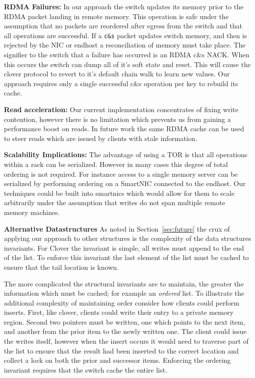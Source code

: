 


\textbf{RDMA Failures:}
In our approach the switch updates its memory prior to the RDMA packet
landing in remote memory. This operation is safe under the assumption that no
packets are reordered after egress from the switch and that all operations
are successful. If a \texttt{c\&s} packet updates switch memory, and then is rejected
by the NIC or endhost a reconciliation of memory must take place. The
signifier to the switch that a failure has occurred is an RDMA c\&s NACK. When
this occurs the switch can dump all of it's soft state and reset. This will
cause the clover protocol to revert to it's default chain walk to learn new
values. Our approach requires only a single successful c\&s operation per key
to rebuild its cache.

\textbf{Read acceleration:}
Our current implementation concentrates of fixing write contention,
however there is no limitation which prevents us from gaining a performance
boost on reads. In future work the same RDMA cache can be used to steer
reads which are issued by clients with stale information.


\textbf{Scalability Implications:}
The advantage of using a TOR is that all operations within a rack can be
serialized. However in many cases this degree of total ordering is not
required. For instance access to a single memory server can be serialized by
performing ordering on a SmartNIC connected to the endhost. Our techniques
could be built into smartnics which would allow for them to scale arbitrarily
under the assumption that writes do not span multiple remote memory machines.


\textbf{Alternative Datastructures}
As noted in Section~\ref{sec:future} the crux of applying our approach to other
structures is the complexity of the data structures invariants. For Clover
the invariant is simple, all writes must append to the end of the list. To
enforce this invariant the last element of the list must be cached to ensure
that the tail location is known.

The more complicated the structural invariants are to maintain, the greater
the information which must be cached; for example an \textit{ordered} list.
To illustrate the additional complexity of maintaining order consider how
clients could perform inserts. First, like clover, clients could write their
entry to a private memory region. Second two pointers must be written, one
which points to the next item, and another from the prior item to the newly
written one. The client could issue the writes itself, however when the
insert occurs it would need to traverse part of the list to ensure that the
result had been inserted to the correct location and collect a lock on both
the prior and successor items. Enforcing the ordering invariant requires that
the switch cache the entire list.

